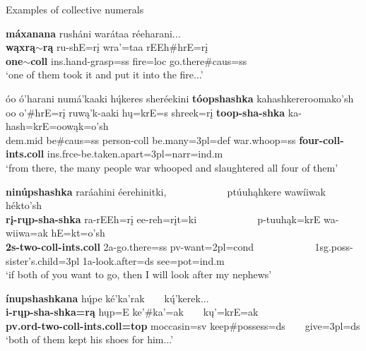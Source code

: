\begin{exe}

\item\label{ExamplesOfCollectiveNums} Examples of collective numerals

\begin{xlist}

\item\label{ExamplesOfCollectiveNums1} \glll \textbf{máxanana} rusháni warátaa réeharani...\\
    \textbf{wąxrą$\sim$rą} ru-shE=rį wra'=taa rEEh\#hrE=rį\\
    \textbf{\textnormal{\bfseries one}$\sim$coll} ins.hand-\textnormal{grasp}=ss \textnormal{fire}=loc \textnormal{go.there}\#caus=ss\\
    \glt `one of them took it and put it into the fire...' \citep[175]{hollow1973b}

\item\label{ExamplesOfCollectiveNums2} \glll óo ó'harani numá'kaaki hų́keres sheréekini \textbf{tóopshashka} kahashkereroomako'sh\\
    oo o'\#hrE=rį ruwą'k-aaki hų=krE=s shreek=rį \textbf{toop-sha-shka} ka-hash=krE=oowąk=o'sh\\
    dem.mid \textnormal{be}\#caus=ss \textnormal{person}-coll \textnormal{be.many}=3pl=def \textnormal{war.whoop}=ss \textbf{\textnormal{\bfseries four}-coll-ints.coll} ins.frce-\textnormal{be.taken.apart}=3pl=narr=ind.m\\
    \glt `from there, the many people war whooped and slaughtered all four of them' \citep[255]{hollow1973b}
    
\item\label{ExamplesOfCollectiveNums3} \glll \textbf{ninúpshashka} raráahini éerehinitki, ~ ~ ~ ~ ~ ~ ~ ptúuhąhkere wawíiwak hékto'sh\\
    \textbf{rį-rųp-sha-shka} ra-rEEh=rį ee-reh=rįt=ki ~ ~ ~ ~ ~ ~ ~ p-tuuhąk=krE wa-wiiwa=ak hE=kt=o'sh\\
    \textbf{2s-\textnormal{\bfseries two}-coll-ints.coll} 2a-\textnormal{go.there}=ss pv-\textnormal{want}=2pl=cond ~ ~ ~ ~ ~ ~ ~ 1sg.poss-\textnormal{sister's.child}=3pl 1a-\textnormal{look.after}=ds \textnormal{see}=pot=ind.m\\
    \glt `if both of you want to go, then I will look after my nephews' \citep[64]{hollow1973b}
    
    
\item\label{ExamplesOfCollectiveNums4} \glll \textbf{ínupshashkana} hų́pe ké'ka'rak ~ ~ kų́'kerek...\\
    \textbf{i-rųp-sha-shka=rą} hųp=E ke'\#ka'=ak ~ ~   kų'=krE=ak\\
    \textbf{pv.ord-\textnormal{\bfseries two}-coll-ints.coll=top} \textnormal{moccasin}=sv \textnormal{keep}\#\textnormal{possess}=ds ~ ~  \textnormal{give}=3pl=ds\\
    \glt `both of them kept his shoes for him...' \citep[109]{hollow1973a}
    

\end{xlist}
\end{exe}
